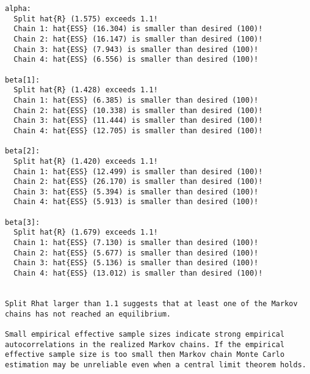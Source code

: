 \documentclass[
  letterpaper,
  DIV=11,
  numbers=noendperiod]{scrartcl}
\newenvironment{Shaded}{\begin{snugshade}}{\end{snugshade}}
\newcommand{\ConstantTok}[1]{\textcolor[rgb]{0.56,0.35,0.01}{#1}}
\newcommand{\FunctionTok}[1]{\textcolor[rgb]{0.28,0.35,0.67}{#1}}
\newcommand{\NormalTok}[1]{\textcolor[rgb]{0.00,0.23,0.31}{#1}}
\newcommand{\OtherTok}[1]{\textcolor[rgb]{0.00,0.23,0.31}{#1}}
\newcommand{\SpecialCharTok}[1]{\textcolor[rgb]{0.37,0.37,0.37}{#1}}
\newcommand{\StringTok}[1]{\textcolor[rgb]{0.13,0.47,0.30}{#1}}
\begin{document}
\begin{Shaded}
\end{Shaded}

\begin{verbatim}
alpha:
  Split hat{R} (1.575) exceeds 1.1!
  Chain 1: hat{ESS} (16.304) is smaller than desired (100)!
  Chain 2: hat{ESS} (16.147) is smaller than desired (100)!
  Chain 3: hat{ESS} (7.943) is smaller than desired (100)!
  Chain 4: hat{ESS} (6.556) is smaller than desired (100)!

beta[1]:
  Split hat{R} (1.428) exceeds 1.1!
  Chain 1: hat{ESS} (6.385) is smaller than desired (100)!
  Chain 2: hat{ESS} (10.338) is smaller than desired (100)!
  Chain 3: hat{ESS} (11.444) is smaller than desired (100)!
  Chain 4: hat{ESS} (12.705) is smaller than desired (100)!

beta[2]:
  Split hat{R} (1.420) exceeds 1.1!
  Chain 1: hat{ESS} (12.499) is smaller than desired (100)!
  Chain 2: hat{ESS} (26.170) is smaller than desired (100)!
  Chain 3: hat{ESS} (5.394) is smaller than desired (100)!
  Chain 4: hat{ESS} (5.913) is smaller than desired (100)!

beta[3]:
  Split hat{R} (1.679) exceeds 1.1!
  Chain 1: hat{ESS} (7.130) is smaller than desired (100)!
  Chain 2: hat{ESS} (5.677) is smaller than desired (100)!
  Chain 3: hat{ESS} (5.136) is smaller than desired (100)!
  Chain 4: hat{ESS} (13.012) is smaller than desired (100)!


Split Rhat larger than 1.1 suggests that at least one of the Markov
chains has not reached an equilibrium.

Small empirical effective sample sizes indicate strong empirical
autocorrelations in the realized Markov chains. If the empirical
effective sample size is too small then Markov chain Monte Carlo
estimation may be unreliable even when a central limit theorem holds.
\end{verbatim}
\end{document}
